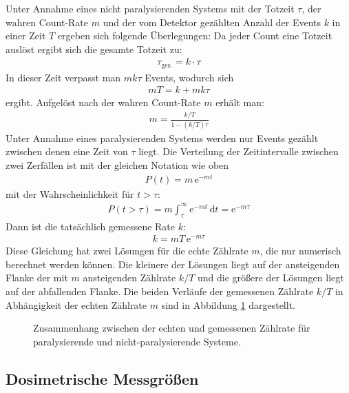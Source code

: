 \documentclass[11pt, a4paper]{article}
\numberwithin{equation}{section}
\begin{document}
Unter Annahme eines nicht paralysierenden Systems mit der Totzeit $\tau$, der wahren Count-Rate $m$ und der vom Detektor gezählten Anzahl der Events $k$ in einer Zeit $T$ ergeben sich folgende Überlegungen\cite{leo}:
Da jeder Count eine Totzeit auslöst ergibt sich die gesamte Totzeit zu:
\begin{align}
	\tau_\mathrm{ges.} = k \cdot \tau
\end{align}
In dieser Zeit verpasst man $m k \tau$ Events, wodurch sich
\begin{align}
	m T = k + m k \tau
\end{align}
ergibt. Aufgelöst nach der wahren Count-Rate $m$ erhält man:
\begin{align}
	m = \frac{k / T}{1 - (k/T) \tau}
\end{align}
Unter Annahme eines paralysierenden Systems werden nur Events gezählt zwischen denen eine Zeit von $\tau$ liegt.
Die Verteilung der Zeitintervalle zwischen zwei Zerfällen ist mit der gleichen Notation wie oben
\begin{align}
	P(t) = m \, \mathrm{e}^{-m t}
\end{align}
mit der Wahrscheinlichkeit für $t > \tau$:
\begin{align}
	P(t>\tau) = m \int_{\tau}^{\infty} \mathrm{e}^{-m t} \, \mathrm{d}t = \mathrm{e}^{-m \tau}
\end{align}
Dann ist die tatsächlich gemessene Rate $k$:
\begin{align}
	k = m T \, \mathrm{e}^{-m \tau} \label{eq:totzeit_paralysierend}
\end{align}
Diese Gleichung hat zwei Lösungen für die echte Zählrate $m$, die nur numerisch berechnet werden können.
Die kleinere der Lösungen liegt auf der ansteigenden Flanke der mit $m$ ansteigenden Zählrate $k/T$ und die größere der Lösungen liegt auf der abfallenden Flanke.
Die beiden Verläufe der gemessenen Zählrate $k/T$ in Abhängigkeit der echten Zählrate $m$ sind in Abbildung \ref{fig:totzeitkorrektur} dargestellt.
\begin{figure}[ht]
	\centering
	
	\caption{Zusammenhang zwischen der echten und gemessenen Zählrate für paralysierende und nicht-paralysierende Systeme.}
	\label{fig:totzeitkorrektur}
\end{figure}


\subsection{Dosimetrische Messgrößen}
\end{document}

